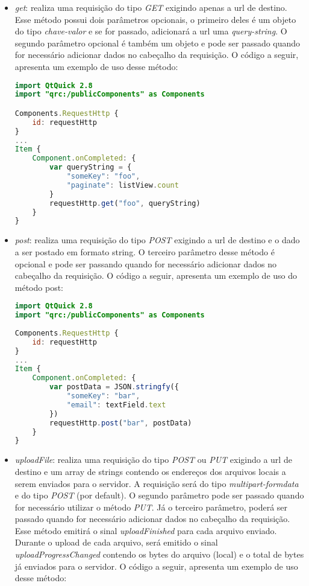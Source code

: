 \begin{itemize}
	\item \textit{get}: realiza uma requisição do tipo \textit{GET} exigindo apenas a url de destino. Esse método possui dois parâmetros opcionais, o primeiro deles é um objeto do tipo \textit{chave-valor} e se for passado, adicionará a url uma \textit{query-string}. O segundo parâmetro opcional é também um objeto e pode ser passado quando for necessário adicionar dados no cabeçalho da requisição. O código a seguir, apresenta um exemplo de uso desse método:

\begin{center}
\begin{lstlisting}[language=qml]
import QtQuick 2.8
import "qrc:/publicComponents" as Components

Components.RequestHttp {
	id: requestHttp
}
...
Item {
	Component.onCompleted: {
		var queryString = {
			"someKey": "foo",
			"paginate": listView.count
		}
		requestHttp.get("foo", queryString)
	}
}
\end{lstlisting}
\end{center}


	\item \textit{post}: realiza uma requisição do tipo \textit{POST} exigindo a url de destino e o dado a ser postado em formato string. O terceiro parâmetro desse método é opcional e pode ser passando quando for necessário adicionar dados no cabeçalho da requisição. O código a seguir, apresenta um exemplo de uso do método post:

\begin{center}
\begin{lstlisting}[language=qml]
import QtQuick 2.8
import "qrc:/publicComponents" as Components
	
Components.RequestHttp {
	id: requestHttp
}
...
Item {
	Component.onCompleted: {
		var postData = JSON.stringfy({
			"someKey": "bar",
			"email": textField.text
		})
		requestHttp.post("bar", postData)
	}
}
\end{lstlisting}
\end{center}


	\item \textit{uploadFile}: realiza uma requisição do tipo \textit{POST} ou \textit{PUT} exigindo a url de destino e um array de strings contendo os endereços dos arquivos locais a serem enviados para o servidor. A requisição será do tipo \textit{multipart-formdata} e do tipo \textit{POST} (por default). O segundo parâmetro pode ser passado quando for necessário utilizar o método \textit{PUT}. Já o terceiro parâmetro, poderá ser passado quando for necessário adicionar dados no cabeçalho da requisição. Esse método emitirá o sinal \textit{uploadFinished} para cada arquivo enviado. Durante o upload de cada arquivo, será emitido o sinal \textit{uploadProgressChanged} contendo os bytes do arquivo (local) e o total de bytes já enviados para o servidor. O código a seguir, apresenta um exemplo de uso desse método:


\end{itemize}
